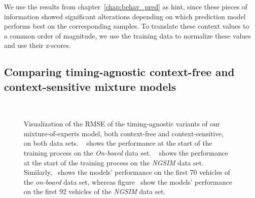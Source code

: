 We use the results from chapter~\ref{chap:behav_pred} as hint, since these pieces of information showed significant alterations depending on which prediction model performs best on the corresponding samples.
To translate these context values to a common order of magnitude, we use the training data to normalize these values and use their z-scores.

\subsection{Comparing timing-agnostic context-free and context-sensitive mixture models}%
\label{subsec:comparing_timing_agnostic_context_free_and_context_sensitive_mixture_models}

\begin{figure}[t]
    \centering
    \\ 
    \caption{Visualization of the \ac{RMSE} of the timing-agnostic variants of our mixture-of-experts model, both context-free and context-sensitive, on both data sets.
~\protect{} shows the performance at the start of the training process on the \emph{On-board} data set. 
~\protect{} shows the performance at the start of the training process on the \emph{\ac{NGSIM}} data set. Similarly,~\protect{} shows the models' performance on the first \num{70} vehicles of the \emph{on-board} data set, whereas figure~\protect{} show the models' performance on the first \num{92} vehicles of the \emph{\ac{NGSIM}} data set.}
    \label{fig:mix_timing_agnostic}
\end{figure}

